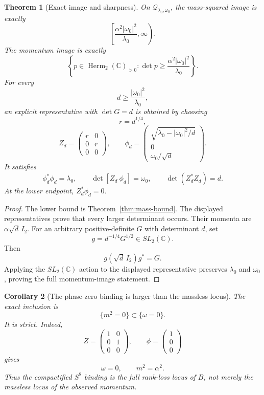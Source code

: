 \documentclass[11pt]{article}
\newtheorem{theorem}{Theorem}[section]
\newtheorem{corollary}[theorem]{Corollary}
\theoremstyle{definition}
\newcommand{\C}{\mathbb C}
\newcommand{\Herm}{\operatorname{Herm}}
\newcommand{\cQ}{\mathscr Q}
\begin{document}
\begin{theorem}[Exact image and sharpness]\label{thm:constrained-image}
On $\cQ_{\lambda_0,\omega_0}$, the mass-squared image is exactly
\[
 \boxed{
 \left[
 \frac{\alpha^2|\omega_0|^2}{\lambda_0},\infty
 \right).}
\]
The momentum image is exactly
\[
 \boxed{
 \left\{p\in\Herm_2(\C)_{>0}:
 \det p\geq\frac{\alpha^2|\omega_0|^2}{\lambda_0}
 \right\}.}
\]
For every
\[
 d\geq\frac{|\omega_0|^2}{\lambda_0},
\]
an explicit representative with $\det G=d$ is obtained by choosing
\[
 r=d^{1/4},
\]
\[
 Z_d=
 \begin{pmatrix}r&0\\0&r\\0&0\end{pmatrix},
 \qquad
 \phi_d=
 \begin{pmatrix}
 \sqrt{\lambda_0-|\omega_0|^2/d}\\
 0\\
 \omega_0/\sqrt d
 \end{pmatrix}.
\]
It satisfies
\[
 \phi_d^*\phi_d=\lambda_0,
 \qquad
 \det[Z_d\ \phi_d]=\omega_0,
 \qquad
 \det(Z_d^*Z_d)=d.
\]
At the lower endpoint, $Z_d^*\phi_d=0$.
\end{theorem}

\begin{proof}
The lower bound is Theorem~\ref{thm:mass-bound}.  The displayed representatives prove that every larger determinant occurs.  Their momenta are $\alpha\sqrt d\,I_2$.  For an arbitrary positive-definite $G$ with determinant $d$, set
\[
 g=d^{-1/4}G^{1/2}\in SL_2(\C).
\]
Then
\[
 g(\sqrt d\,I_2)g^*=G.
\]
Applying the $SL_2(\C)$ action to the displayed representative preserves $\lambda_0$ and $\omega_0$, proving the full momentum-image statement.
\end{proof}

\begin{corollary}[The phase-zero binding is larger than the massless locus]\label{cor:binding-massless}
The exact inclusion is
\[
 \{m^2=0\}\subset\{\omega=0\}.
\]
It is strict.  Indeed,
\[
 Z=\begin{pmatrix}1&0\\0&1\\0&0\end{pmatrix},
 \qquad
 \phi=\begin{pmatrix}1\\0\\0\end{pmatrix}
\]
gives
\[
 \omega=0,
 \qquad
 m^2=\alpha^2.
\]
Thus the compactified $S^8$ binding is the full rank-loss locus of $B$, not merely the massless locus of the observed momentum.
\end{corollary}
\end{document}
